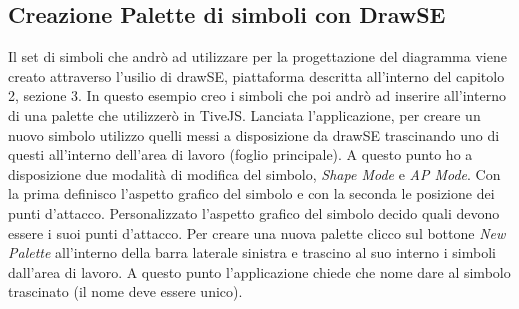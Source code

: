         \subsection{Creazione Palette di simboli con DrawSE}
            Il set di simboli che andrò ad utilizzare per la progettazione del diagramma viene creato attraverso l'usilio di drawSE, piattaforma descritta all'interno del capitolo 2, sezione 3. In questo esempio creo i simboli che poi andrò ad inserire all'interno di una palette che utilizzerò in TiveJS.
            \newline
            Lanciata l'applicazione, per creare un nuovo simbolo utilizzo quelli messi a disposizione da drawSE trascinando uno di questi all'interno dell'area di lavoro (foglio principale). A questo punto ho a disposizione due modalità di modifica del simbolo, \textit{Shape Mode} e \textit{AP Mode}. Con la prima definisco l'aspetto grafico del simbolo e con la seconda le posizione dei punti d'attacco. Personalizzato l'aspetto grafico del simbolo decido quali devono essere i suoi punti d'attacco.
            \newline
            Per creare una nuova palette clicco sul bottone \textit{New Palette} all'interno della barra laterale sinistra e trascino al suo interno i simboli dall'area di lavoro. A questo punto l'applicazione chiede che nome dare al simbolo trascinato (il nome deve essere unico).

